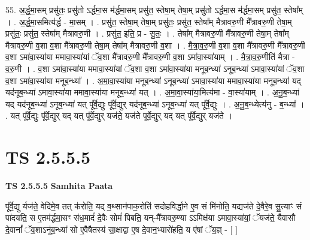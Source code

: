 \documentclass[17pt]{extarticle}
\begin{document}
55. अ॒र्द्ध॒मा॒सम् प्रसु॑तः॒ प्रसु॑तो ऽर्द्धमा॒स म॑र्द्धमा॒सम् प्रसु॑त॒ स्तेषा॒म् तेषा॒म् प्रसु॑तो ऽर्द्धमा॒स म॑र्द्धमा॒सम् प्रसु॑त॒ स्तेषा᳚म् । . अ॒र्द्ध॒मा॒समित्य॑र्द्ध - मा॒सम् । . प्रसु॑त॒ स्तेषा॒म् तेषा॒म् प्रसु॑तः॒ प्रसु॑त॒ स्तेषा᳚म् मैत्रावरु॒णी मै᳚त्रावरु॒णी तेषा॒म् प्रसु॑तः॒ प्रसु॑त॒ स्तेषा᳚म् मैत्रावरु॒णी । . प्रसु॑त॒ इति॒ प्र - सु॒तः॒ । . तेषा᳚म् मैत्रावरु॒णी मै᳚त्रावरु॒णी तेषा॒म् तेषा᳚म् मैत्रावरु॒णी व॒शा व॒शा मै᳚त्रावरु॒णी तेषा॒म् तेषा᳚म् मैत्रावरु॒णी व॒शा । . मै॒त्रा॒व॒रु॒णी व॒शा व॒शा मै᳚त्रावरु॒णी मै᳚त्रावरु॒णी व॒शा ऽमा॑वा॒स्या॑या ममावा॒स्या॑यां ॅव॒शा मै᳚त्रावरु॒णी मै᳚त्रावरु॒णी व॒शा ऽमा॑वा॒स्या॑याम् । . मै॒त्रा॒व॒रु॒णीति॑ मैत्रा - व॒रु॒णी । . व॒शा ऽमा॑वा॒स्या॑या ममावा॒स्या॑यां ॅव॒शा व॒शा ऽमा॑वा॒स्या॑या मनूब॒न्ध्या॑ ऽनूब॒न्ध्या॑ ऽमावा॒स्या॑यां ॅव॒शा व॒शा ऽमा॑वा॒स्या॑या मनूब॒न्ध्या᳚ । . अ॒मा॒वा॒स्या॑या मनूब॒न्ध्या॑ ऽनूब॒न्ध्या॑ ऽमावा॒स्या॑या ममावा॒स्या॑या मनूब॒न्ध्या॑ यद् यद॑नूब॒न्ध्या॑ ऽमावा॒स्या॑या ममावा॒स्या॑या मनूब॒न्ध्या॑ यत् । . अ॒मा॒वा॒स्या॑या॒मित्य॑मा - वा॒स्या॑याम् । . अ॒नू॒ब॒न्ध्या॑ यद् यद॑नूब॒न्ध्या॑ ऽनूब॒न्ध्या॑ यत् पू᳚र्वे॒द्युः पू᳚र्वे॒द्युर् यद॑नूब॒न्ध्या॑ ऽनूब॒न्ध्या॑ यत् पू᳚र्वे॒द्युः । . अ॒नू॒ब॒न्ध्येत्य॑नु - ब॒न्ध्या᳚ । . यत् पू᳚र्वे॒द्युः पू᳚र्वे॒द्युर् यद् यत् पू᳚र्वे॒द्युर् यज॑ते॒ यज॑ते पूर्वे॒द्युर् यद् यत् पू᳚र्वे॒द्युर् यज॑ते । \newline
\pagebreak
{}

\section{ TS 2.5.5.5 }

\textbf{TS 2.5.5.5 } \newline
\textbf{Samhita Paata} \newline

पू᳚र्वे॒द्यु र्यज॑ते॒ वेदि॑मे॒व तत् क॑रोति॒ यद् व॒थ्सान॑पाक॒रोति॑ सदोहविर्द्धा॒ने ए॒व सं मि॑नोति॒ यद्यज॑ते दे॒वैरे॒व सु॒त्याꣳ सं पा॑दयति॒ स ए॒तम॑र्द्धमा॒सꣳ स॑ध॒मादं॑ दे॒वैः सोमं॑ पिबति॒ यन्-मै᳚त्रावरु॒ण्या ऽऽमिक्ष॑या ऽमावा॒स्या॑यां॒ ॅयज॑ते॒ यैवासौ दे॒वानां᳚ ॅव॒शाऽनू॑ब॒न्ध्या॑ सो ए॒वैषैतस्य॑ सा॒क्षाद्वा ए॒ष दे॒वान॒भ्यारो॑हति॒ य ए॑षां ॅय॒ज्ञ् - [  ] \newline
\end{document}
